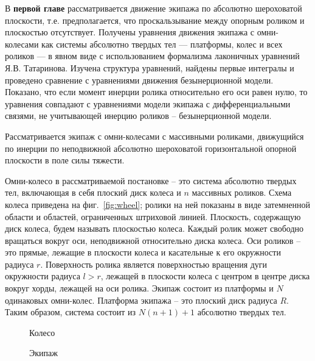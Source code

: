 
В \textbf{первой главе} рассматривается движение экипажа по абсолютно шероховатой плоскости, т.е. предполагается, что проскальзывание между опорным роликом и плоскостью отсутствует. Получены уравнения движения экипажа с омни-колесами как системы абсолютно твердых тел --- платформы, колес и всех роликов --- в явном виде с использованием формализма лаконичных уравнений Я.В. Татаринова. Изучена структура уравнений, найдены первые интегралы и проведено сравнение с уравнениями движения безынерционной модели. Показано, что если момент инерции ролика относительно его оси равен нулю, то уравнения совпадают с уравнениями модели экипажа с дифференциальными связями, не учитывающей инерцию роликов -- безынерционной модели.

Рассматривается экипаж с омни-колесами с массивными роликами, движущийся по инерции по неподвижной абсолютно шероховатой горизонтальной опорной плоскости в поле силы тяжести. 

Омни-колесо в рассматриваемой постановке -- это система абсолютно твердых тел, включающая в себя плоский диск колеса и $n$ массивных роликов. Схема колеса приведена на фиг.~\ref{fig:wheel}; ролики на ней показаны в виде затемненной области и областей, ограниченных штриховой линией. Плоскость, содержащую диск колеса, будем называть плоскостью колеса. Каждый ролик может свободно вращаться вокруг оси, неподвижной относительно диска колеса. Оси роликов -- это прямые, лежащие в плоскости колеса и касательные к его окружности радиуса $r$. Поверхность ролика является поверхностью вращения дуги окружности радиуса $l > r$, лежащей в плоскости колеса с центром в центре диска вокруг хорды, лежащей на оси ролика. Экипаж состоит из платформы и $N$ одинаковых омни-колес. Платформа экипажа -- это плоский диск радиуса $R$. Таким образом, система состоит из $N(n+1) + 1$ абсолютно твердых тел.

\begin{figure}[h]
        \centering
        \caption{Колесо}
        \label{fig:wheel}
    \endminipage
        \centering
        \caption{Экипаж}
        \label{fig:vehicle}
    \endminipage
\end{figure}

